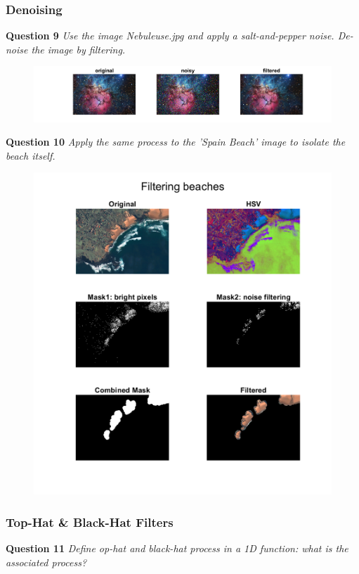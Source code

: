 \newpage
\subsubsection{Denoising}
\textbf{Question 9} \textit{Use the image Nebuleuse.jpg and apply a salt-and-pepper noise. De-noise the image by ﬁltering.}

\begin{figure}[H]
    \centering
    \includegraphics[width=\linewidth]{Doc/Graphics/Part2/part2_Q9.png}
\end{figure}


\textbf{Question 10} \textit{Apply the same process to the ’Spain Beach’ image to isolate the beach itself.}

\begin{figure}[H]
    \centering
    \includegraphics[width=0.75\linewidth]{Doc/Graphics/Part2/part2_Q10.png}
\end{figure}




\newpage
\subsubsection{Top-Hat \& Black-Hat Filters}
\textbf{Question 11} \textit{Deﬁne op-hat and black-hat process in a 1D function: what is the associated process?}


